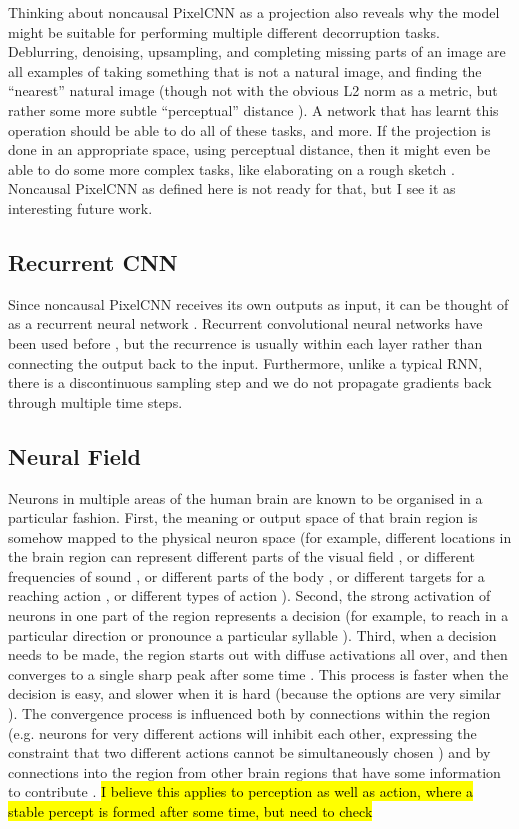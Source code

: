 \documentclass[10pt,a4paper]{article}
\newcommand{\nquote}[1]{``{#1}''}
\begin{document}
Thinking about noncausal PixelCNN as a projection also reveals why the model might be suitable for performing multiple different decorruption tasks. Deblurring, denoising, upsampling, and completing missing parts of an image are all examples of taking something that is not a natural image, and finding the \nquote{nearest} natural image (though not with the obvious L2 norm as a metric, but rather some more subtle \nquote{perceptual} distance \cite{??}). A network that has learnt this operation should be able to do all of these tasks, and more. If the projection is done in an appropriate space, using perceptual distance, then it might even be able to do some more complex tasks, like elaborating on a rough sketch \cite{??}. Noncausal PixelCNN as defined here is not ready for that, but I see it as interesting future work.

\subsection{Recurrent CNN}

Since noncausal PixelCNN receives its own outputs as input, it can be thought of as a recurrent neural network \cite{??}. Recurrent convolutional neural networks have been used before \cite{??}\cite{??}, but the recurrence is usually within each layer rather than connecting the output back to the input. Furthermore, unlike a typical RNN, there is a discontinuous sampling step and we do not propagate gradients back through multiple time steps.

\subsection{Neural Field}

Neurons in multiple areas of the human brain are known to be organised in a particular fashion. First, the meaning or output space of that brain region is somehow mapped to the physical neuron space \cite{??} (for example, different locations in the brain region can represent different parts of the visual field \cite{??}, or different frequencies of sound \cite{??}, or different parts of the body \cite{??}, or different targets for a reaching action \cite{??}, or different types of action \cite{??}). Second, the strong activation of neurons in one part of the region represents a decision \cite{??} (for example, to reach in a particular direction \cite{??} or pronounce a particular syllable \cite{??}). Third, when a decision needs to be made, the region starts out with diffuse activations all over, and then converges to a single sharp peak after some time \cite{??}. This process is faster when the decision is easy, and slower when it is hard \cite{??} (because the options are very similar \cite{??}). The convergence process is influenced both by connections within the region (e.g. neurons for very different actions will inhibit each other, expressing the constraint that two different actions cannot be simultaneously chosen \cite{??}) and by connections into the region from other brain regions that have some information to contribute \cite{??}. \hl{I believe this applies to perception as well as action, where a stable percept is formed after some time, but need to check}
\end{document}
